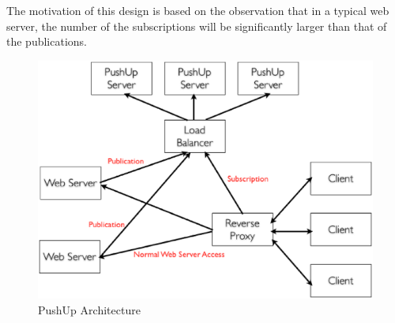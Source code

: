 The motivation of this design is based on the observation that in a typical web server,
the number of the subscriptions will be significantly larger than that of the 
publications.

\begin{figure}[htb!]
\centering%
    \includegraphics[scale=0.30]{figures/pushup.eps}
    \caption{PushUp Architecture}
    \label{fig:architecture}
\end{figure}

